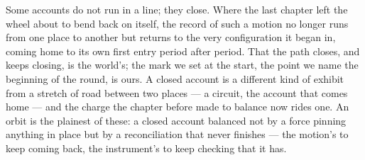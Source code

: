 %
%
%
%

\noindent Some accounts do not run in a line; they close. Where the last chapter left the wheel about to bend
back on itself, the record of such a motion no longer runs from one place to another but returns to the very
configuration it began in, coming home to its own first entry period after period. That the path closes, and
keeps closing, is the world's; the mark we set at the start, the point we name the beginning of the round, is
ours. A closed account is a different kind of exhibit from a stretch of road between two places --- a circuit,
the account that comes home --- and the charge the chapter before made to balance now rides one. An orbit is
the plainest of these: a closed account balanced not by a force pinning anything in place but by a
reconciliation that never finishes --- the motion's to keep coming back, the instrument's to keep checking that
it has.

